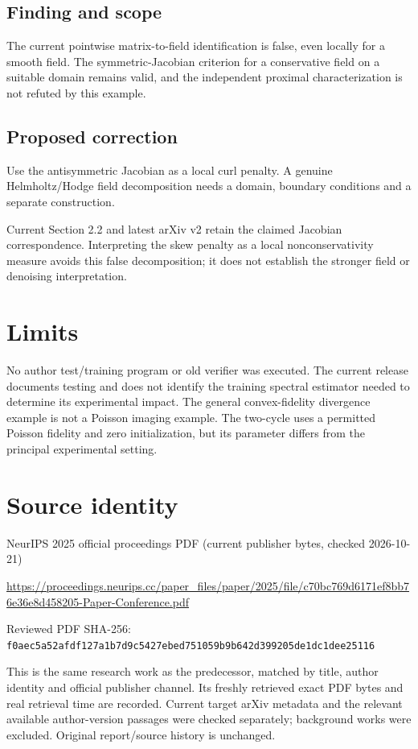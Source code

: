 \documentclass[11pt]{article}
\begin{document}
\subsection*{Finding and scope}

The current pointwise matrix-to-field identification is false, even locally for a smooth field. The symmetric-Jacobian criterion for a conservative field on a suitable domain remains valid, and the independent proximal characterization is not refuted by this example.

\subsection*{Proposed correction}

Use the antisymmetric Jacobian as a local curl penalty. A genuine Helmholtz/Hodge field decomposition needs a domain, boundary conditions and a separate construction.

Current Section 2.2 and latest arXiv v2 retain the claimed Jacobian correspondence. Interpreting the skew penalty as a local nonconservativity measure avoids this false decomposition; it does not establish the stronger field or denoising interpretation.

\section*{Limits}

No author test/training program or old verifier was executed. The current release documents testing and does not identify the training spectral estimator needed to determine its experimental impact. The general convex-fidelity divergence example is not a Poisson imaging example. The two-cycle uses a permitted Poisson fidelity and zero initialization, but its parameter differs from the principal experimental setting.\par

\section*{Source identity}

NeurIPS 2025 official proceedings PDF (current publisher bytes, checked 2026-10-21)

\url{https://proceedings.neurips.cc/paper_files/paper/2025/file/c70bc769d6171ef8bb76e36e8d458205-Paper-Conference.pdf}

Reviewed PDF SHA-256: \nolinkurl{f0aec5a52afdf127a1b7d9c5427ebed751059b9b642d399205de1dc1dee25116}

This is the same research work as the predecessor, matched by title, author identity and official publisher channel. Its freshly retrieved exact PDF bytes and real retrieval time are recorded. Current target arXiv metadata and the relevant available author-version passages were checked separately; background works were excluded. Original report/source history is unchanged.
\end{document}

